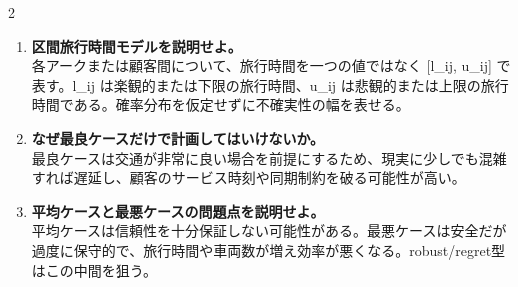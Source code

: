 \begin{multicols}{2}
\begin{enumerate}
\item \textbf{区間旅行時間モデルを説明せよ。}\\
各アークまたは顧客間について、旅行時間を一つの値ではなく [l\_ij, u\_ij] で表す。l\_ij は楽観的または下限の旅行時間、u\_ij は悲観的または上限の旅行時間である。確率分布を仮定せずに不確実性の幅を表せる。
\item \textbf{なぜ最良ケースだけで計画してはいけないか。}\\
最良ケースは交通が非常に良い場合を前提にするため、現実に少しでも混雑すれば遅延し、顧客のサービス時刻や同期制約を破る可能性が高い。
\item \textbf{平均ケースと最悪ケースの問題点を説明せよ。}\\
平均ケースは信頼性を十分保証しない可能性がある。最悪ケースは安全だが過度に保守的で、旅行時間や車両数が増え効率が悪くなる。robust/regret型はこの中間を狙う。
\end{enumerate}

\end{multicols}

\clearpage



\vspace{1.5mm}

